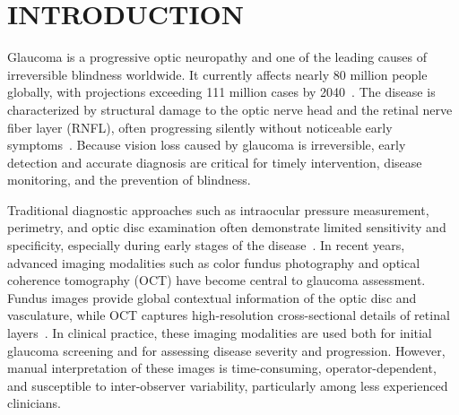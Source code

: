 \documentclass[preprint,12pt]{elsarticle}
\begin{document}


\section{INTRODUCTION}
\label{sec:introduction}

Glaucoma is a progressive optic neuropathy and one of the leading causes of irreversible blindness worldwide. It currently affects nearly 80 million people globally, with projections exceeding 111 million cases by 2040~\cite{tham2014global}. The disease is characterized by structural damage to the optic nerve head and the retinal nerve fiber layer (RNFL), often progressing silently without noticeable early symptoms~\cite{mcmonnies2017glaucoma}. Because vision loss caused by glaucoma is irreversible, early detection and accurate diagnosis are critical for timely intervention, disease monitoring, and the prevention of blindness.

Traditional diagnostic approaches such as intraocular pressure measurement, perimetry, and optic disc examination often demonstrate limited sensitivity and specificity, especially during early stages of the disease~\cite{Shan2024,jayaram2023glaucoma}. In recent years, advanced imaging modalities such as color fundus photography and optical coherence tomography (OCT) have become central to glaucoma assessment. Fundus images provide global contextual information of the optic disc and vasculature, while OCT captures high-resolution cross-sectional details of retinal layers~\cite{kanski10}. In clinical practice, these imaging modalities are used both for initial glaucoma screening and for assessing disease severity and progression. However, manual interpretation of these images is time-consuming, operator-dependent, and susceptible to inter-observer variability, particularly among less experienced clinicians.
\end{document}
